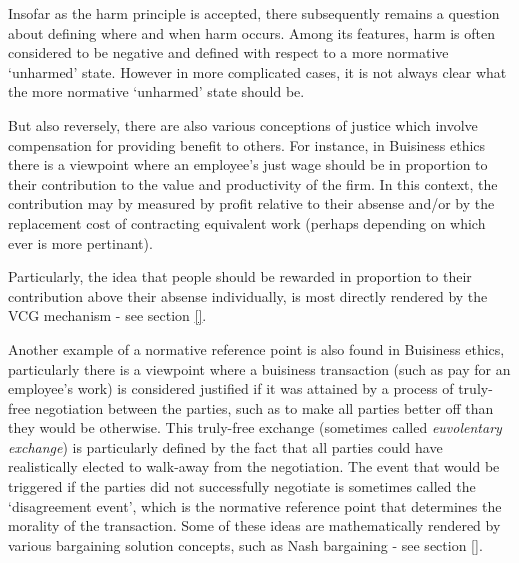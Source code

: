 Insofar as the harm principle is accepted, there subsequently remains a question about defining where and when harm occurs.
Among its features, harm is often considered to be negative and defined with respect to a more normative `unharmed' state.
However in more complicated cases, it is not always clear what the more normative `unharmed' state should be.%

But also reversely, there are also various conceptions of justice which involve compensation for providing benefit to others.
For instance, in Buisiness ethics there is a viewpoint where an employee's just wage should be in proportion to their contribution to the value and productivity of the firm.\cite{sternberg2000just}
In this context, the contribution may by measured by profit relative to their absense and/or by the replacement cost of contracting equivalent work (perhaps depending on which ever is more pertinant).

Particularly, the idea that people should be rewarded in proportion to their contribution above their absense individually, is most directly rendered by the VCG mechanism - see section \ref{}.


Another example of a normative reference point is also found in Buisiness ethics, particularly there is a viewpoint where a buisiness transaction (such as pay for an employee's work) is considered justified if it was attained by a process of truly-free negotiation between the parties, such as to make all parties better off than they would be otherwise.\cite{ExecutiveCompensationUnjustorJustRight} 
This truly-free exchange (sometimes called \textit{euvolentary exchange}) is particularly defined by the fact that all parties could have realistically elected to walk-away from the negotiation.\cite{Guzman2019}
The event that would be triggered if the parties did not successfully negotiate is sometimes called the `disagreement event', which is the normative reference point that determines the morality of the transaction.
Some of these ideas are mathematically rendered by various bargaining solution concepts, such as Nash bargaining - see section \ref{}.

